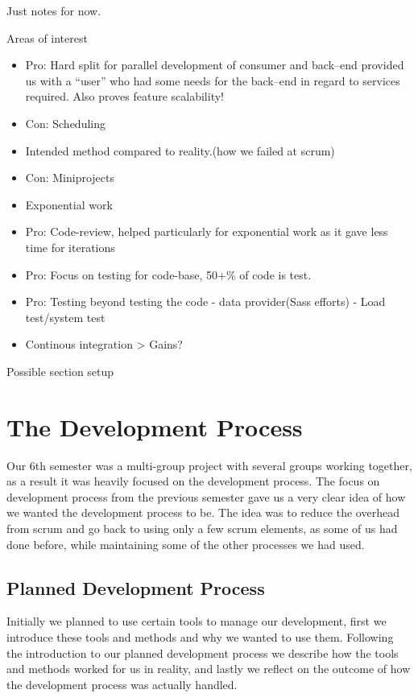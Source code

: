 Just notes for now.

\bigskip
Areas of interest
\begin{itemize}
    \item Pro: Hard split for parallel development of consumer and back--end provided us with a ``user'' who had some needs for the back--end in regard to services required. Also proves feature scalability!
    \item Con: Scheduling
    \item Intended method compared to reality.(how we failed at scrum)
    \item Con: Miniprojects
    \item Exponential work
    \item Pro: Code-review, helped particularly for exponential work as it gave less time for iterations
    \item Pro: Focus on testing for code-base, 50+\% of code is test.
    \item Pro: Testing beyond testing the code -  data provider(Sass efforts) - Load test/system test
    \item Continous integration > Gains?
\end{itemize}

Possible section setup
\section{The Development Process}
Our 6th semester was a multi-group project with several groups working together, as a result it was heavily focused on the development process.
The focus on development process from the previous semester gave us a very clear idea of how we wanted the development process to be.
The idea was to reduce the overhead from scrum and go back to using only a few scrum elements, as some of us had done before, while maintaining some of the other processes we had used.
\subsection{Planned Development Process}
Initially we planned to use certain tools to manage our development, first we introduce these tools and methods and why we wanted to use them.
Following the introduction to our planned development process we describe how the tools and methods worked for us in reality, and lastly we reflect on the outcome of how the development process was actually handled.
